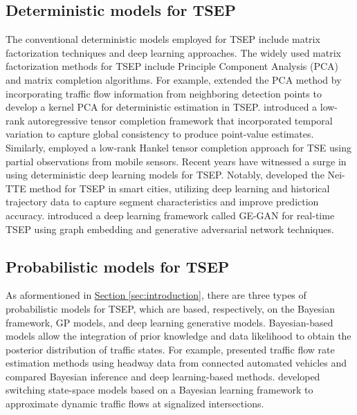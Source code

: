\documentclass[a4paper,fleqn,12pt]{cas-sc}
\begin{document}
\subsection{Deterministic models for TSEP}
 The conventional deterministic models employed for TSEP include matrix factorization techniques and deep learning approaches. The widely used matrix factorization methods for TSEP include Principle Component Analysis (PCA) and matrix completion algorithms. For example, \cite{Li2013EfficientMD} extended the PCA method by incorporating traffic flow information from neighboring detection points to develop a kernel PCA for deterministic estimation in TSEP. \cite{chen2021low} introduced a low-rank autoregressive tensor completion framework that incorporated temporal variation to capture global consistency to produce point-value estimates. Similarly, \cite{wang2023low} employed a low-rank Hankel tensor completion approach for TSE using partial observations from mobile sensors. Recent years have witnessed a surge in using deterministic deep learning models for TSEP. Notably, \cite{qiu2019nei} developed the Nei-TTE method for TSEP in smart cities, utilizing deep learning and historical trajectory data to capture segment characteristics and improve prediction accuracy. \cite{xu2020ge} introduced a deep learning framework called GE-GAN for real-time TSEP using graph embedding and generative adversarial network techniques.

\subsection{Probabilistic models for TSEP}
As aformentioned in \hyperref[sec:introduction]{Section \ref{sec:introduction}}, there are three types of probabilistic models for TSEP, which are based, respectively, on the Bayesian framework, GP models, and deep learning generative models. Bayesian-based models allow the integration of prior knowledge and data likelihood to obtain the posterior distribution of traffic states. For example, \cite{han2021estimation} presented traffic flow rate estimation methods using headway data from connected automated vehicles and compared Bayesian inference and deep learning-based methods. \cite{zhang2023approximate} developed switching state-space models based on a Bayesian learning framework to approximate dynamic traffic flows at signalized intersections.
\end{document}
